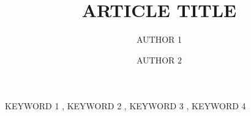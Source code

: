 \documentclass[review]{elsarticle}
\begin{document}
\begin{frontmatter}

\title{ARTICLE TITLE}

\author[firstAddress,secondAddress]{AUTHOR 1}

\author[secondAddress]{AUTHOR 2}

\address[firstAddress]{FIRST ADDRESS}
\address[secondAddress]{SECOND ADDRESS}

\begin{abstract}
    \lipsum[2-3]
\end{abstract}

\begin{keyword}
    KEYWORD 1 \sep{} KEYWORD 2 \sep{} KEYWORD 3 \sep{} KEYWORD 4
\end{keyword}

\end{frontmatter}

\linenumbers{}







\printbibliography{}
\end{document}
